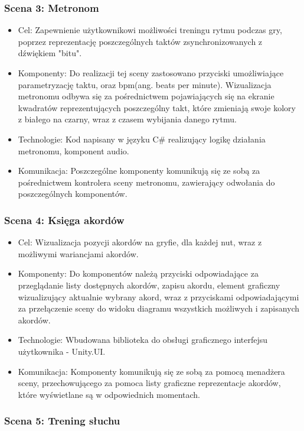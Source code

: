 \subsubsection{Scena 3: Metronom}

\begin{itemize}
\item Cel: Zapewnienie użytkownikowi możliwości treningu rytmu podczas gry, poprzez reprezentację poszczególnych taktów zsynchronizowanych z dźwiękiem "bitu".
\item Komponenty: Do realizacji tej sceny zastosowano przyciski umożliwiające parametryzację taktu, oraz bpm(ang. beats per minute). Wizualizacja metronomu odbywa się za pośrednictwem pojawiających się na ekranie kwadratów reprezentujących poszczególny takt, które zmieniają swoje kolory z białego na czarny, wraz z czasem wybijania danego rytmu.
\item Technologie: Kod napisany w języku C\# realizujący logikę działania metronomu, komponent audio.
\item Komunikacja: Poszczególne komponenty komunikują się ze sobą za pośrednictwem kontrolera sceny metronomu, zawierający odwołania do poszczególnych komponentów.
\end{itemize}

\subsubsection{Scena 4: Księga akordów}

\begin{itemize}
\item Cel: Wizualizacja pozycji akordów na gryfie, dla każdej nut, wraz z możliwymi wariancjami akordów.
\item Komponenty: Do komponentów należą przyciski odpowiadające za przeglądanie listy dostępnych akordów, zapisu akordu, element graficzny wizualizujący aktualnie wybrany akord, wraz z przyciskami odpowiadającymi za przełączenie sceny do widoku diagramu wszystkich możliwych i zapisanych akordów.
\item Technologie: Wbudowana biblioteka do obsługi graficznego interfejsu użytkownika - Unity.UI.
\item Komunikacja: Komponenty komunikują się ze sobą za pomocą menadżera sceny, przechowującego za pomoca listy graficzne reprezentacje akordów, które wyświetlane są w odpowiednich momentach. 
\end{itemize}

\subsubsection{Scena 5: Trening słuchu}

